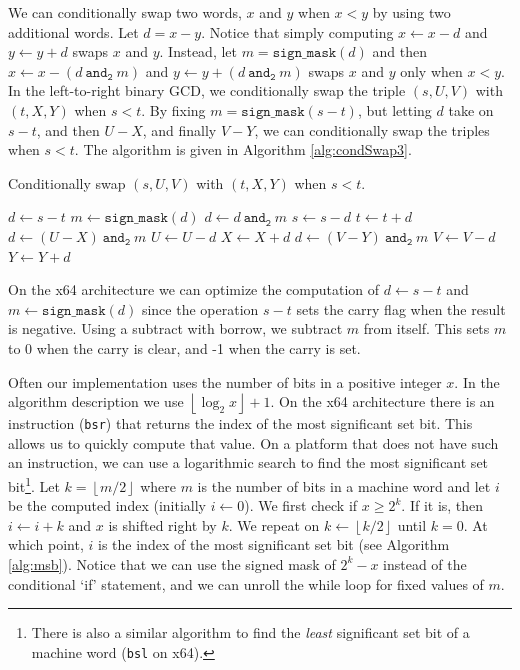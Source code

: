 \documentclass{ucalgthes1}
\theoremstyle{definition}
\newcommand{\floor}[1]{\left\lfloor #1 \right\rfloor}
\newcommand{\band}{~\texttt{and}_\texttt{2}~}
\begin{document}
We can conditionally swap two words, $x$ and $y$ when $x < y$ by using two additional words.  Let $d = x - y$.  Notice that simply computing $x \gets x - d$ and $y \gets y + d$ swaps $x$ and $y$.  Instead, let $m = \texttt{sign\_mask}(d)$ and then  $x \gets x - (d \band m)$ and $y \gets y + (d \band m)$ swaps $x$ and $y$ only when $x < y$.  In the left-to-right binary GCD, we conditionally swap the triple $(s, U, V)$ with $(t, X, Y)$ when $s < t$.  By fixing $m = \texttt{sign\_mask}(s - t)$, but letting $d$ take on $s - t$, and then $U - X$, and finally $V - Y$, we can conditionally swap the triples when $s < t$. The algorithm is given in Algorithm \ref{alg:condSwap3}.
\begin{algorithm}[h]
\caption{Conditionally swap $(s, U, V)$ with $(t, X, Y)$ when $s < t$.}
\label{alg:condSwap3}
\begin{algorithmic}[1]
\STATE $d \gets s - t$
\STATE $m \gets \texttt{sign\_mask}(d)$
\STATE $d \gets d \band m$
\STATE $s \gets s - d$
\STATE $t \gets t + d$
\STATE $d \gets (U - X) \band m$
\STATE $U \gets U - d$
\STATE $X \gets X + d$
\STATE $d \gets (V - Y) \band m$
\STATE $V \gets V - d$
\STATE $Y \gets Y + d$
\end{algorithmic}
\end{algorithm}
On the x64 architecture we can optimize the computation of $d \gets s - t$ and $m \gets \texttt{sign\_mask}(d)$ since the operation $s-t$ sets the carry flag when the result is negative.  Using a subtract with borrow, we subtract $m$ from itself.  This sets $m$ to 0 when the carry is clear, and -1 when the carry is set.

Often our implementation uses the number of bits in a positive integer $x$.  In the algorithm description we use $\floor{\log_2x} + 1$.  On the x64 architecture there is an instruction (\texttt{bsr}) that returns the index of the most significant set bit.  This allows us to quickly compute that value.  On a platform that does not have such an instruction, we can use a logarithmic search to find the most significant set bit\footnote{There is also a similar algorithm to find the \emph{least} significant set bit of a machine word (\texttt{bsl} on x64).}.  Let $k = \floor{m/2}$ where $m$ is the number of bits in a machine word and let $i$ be the computed index (initially $i \gets 0$).  We first check if $x \ge 2^k$.  If it is, then $i \gets i + k$ and $x$ is shifted right by $k$.  We repeat on $k \gets \floor{k/2}$ until $k=0$.  At which point, $i$ is the index of the most significant set bit (see Algorithm \ref{alg:msb}).  Notice that we can use the signed mask of $2^k - x$ instead of the conditional `if' statement, and we can unroll the while loop for fixed values of $m$.
\end{document}

